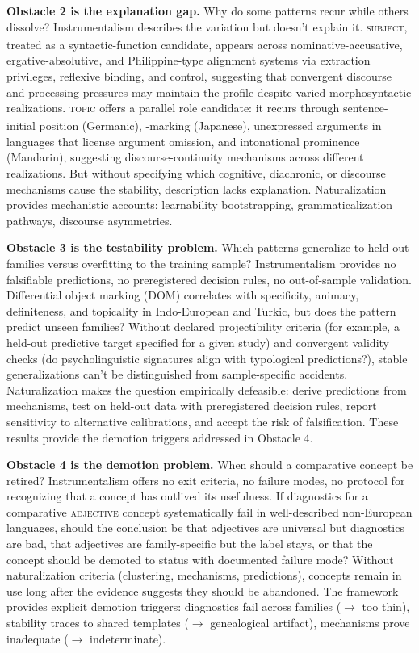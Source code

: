 \documentclass[12pt]{article}
\begin{document}
\textbf{Obstacle 2 is the explanation gap.} Why do some patterns recur while others dissolve? Instrumentalism describes the variation but doesn't explain it. \textsc{subject}\textsubscript{\Cross}, treated as a syntactic-function candidate, appears across nominative-accusative, ergative-absolutive, and Philippine-type alignment systems via extraction privileges, reflexive binding, and control, suggesting that convergent discourse and processing pressures may maintain the profile despite varied morphosyntactic realizations. \textsc{topic}\textsubscript{\Cross} offers a parallel role candidate: it recurs through sentence-initial position (Germanic), -marking (Japanese), unexpressed arguments in languages that license argument omission, and intonational prominence (Mandarin), suggesting discourse-continuity mechanisms across different realizations. But without specifying which cognitive, diachronic, or discourse mechanisms cause the stability, description lacks explanation. Naturalization provides mechanistic accounts: learnability bootstrapping, grammaticalization pathways, discourse asymmetries.

\textbf{Obstacle 3 is the testability problem.} Which patterns generalize to held-out families versus overfitting to the training sample? Instrumentalism provides no falsifiable predictions, no preregistered decision rules, no out-of-sample validation. Differential object marking (DOM) correlates with specificity, animacy, definiteness, and topicality in Indo-European and Turkic, but does the pattern predict unseen families? Without declared projectibility criteria (for example, a held-out predictive target specified for a given study) and convergent validity checks (do psycholinguistic signatures align with typological predictions?), stable generalizations can't be distinguished from sample-specific accidents. Naturalization makes the question empirically defeasible: derive predictions from mechanisms, test on held-out data with preregistered decision rules, report sensitivity to alternative calibrations, and accept the risk of falsification. These results provide the demotion triggers addressed in Obstacle 4.

\textbf{Obstacle 4 is the demotion problem.} When should a comparative concept be retired? Instrumentalism offers no exit criteria, no failure modes, no protocol for recognizing that a concept has outlived its usefulness. If diagnostics for a comparative \textsc{adjective} concept systematically fail in well-described non-European languages, should the conclusion be that adjectives are universal but diagnostics are bad, that adjectives are family-specific but the label stays, or that the concept should be demoted to  status with documented failure mode? Without naturalization criteria (clustering, mechanisms, predictions), concepts remain in use long after the evidence suggests they should be abandoned. The framework provides explicit demotion triggers: diagnostics fail across families ($\to$ too thin), stability traces to shared templates ($\to$ genealogical artifact), mechanisms prove inadequate ($\to$ indeterminate).
\end{document}
